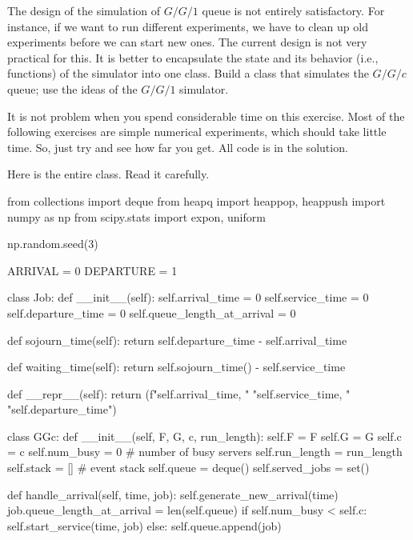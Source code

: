 \begin{exercise}
  The design of the simulation of $G/G/1$ queue is not entirely satisfactory. For instance, if we want to run different experiments, we have to clean up old experiments before we can start new ones. The current design is not very practical for this. It is better to encapsulate the state and its behavior (i.e., functions) of the simulator into one class. Build a class that simulates the $G/G/c$ queue; use the ideas of the $G/G/1$ simulator.

It is not  problem when you spend considerable time on this exercise. Most of the following exercises are simple numerical experiments, which should take little time. So, just try and see how far you get. All code is in the solution.

\begin{solution}
Here is the entire class. Read it carefully.   


\begin{pyverbatim}
from collections import deque
from heapq import heappop, heappush
import numpy as np
from scipy.stats import expon, uniform

np.random.seed(3)

ARRIVAL = 0
DEPARTURE = 1


class Job:
    def __init__(self):
        self.arrival_time = 0
        self.service_time = 0
        self.departure_time = 0
        self.queue_length_at_arrival = 0

    def sojourn_time(self):
        return self.departure_time - self.arrival_time

    def waiting_time(self):
        return self.sojourn_time() - self.service_time

    def __repr__(self):
        return (f"{self.arrival_time}, "
                 "{self.service_time}, "
                 "{self.departure_time}\n")



class GGc:
    def __init__(self, F, G, c, run_length):
        self.F = F
        self.G = G
        self.c = c
        self.num_busy = 0   # number of busy servers
        self.run_length = run_length
        self.stack = [] # event stack
        self.queue = deque()
        self.served_jobs = set()

    def handle_arrival(self, time, job):
        self.generate_new_arrival(time)
        job.queue_length_at_arrival = len(self.queue)
        if self.num_busy < self.c:
            self.start_service(time, job)
        else:
            self.queue.append(job)


\end{pyverbatim}
\end{solution}
\end{exercise}
